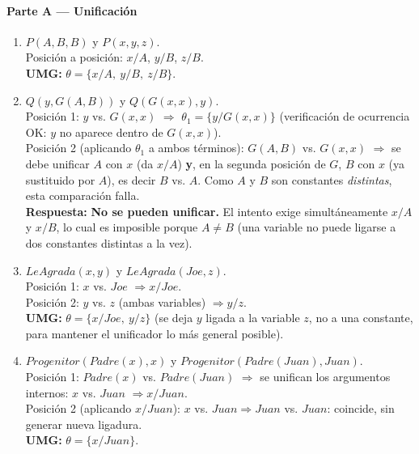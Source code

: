 \paragraph{Parte A --- Unificación}

\begin{enumerate}
    \item $P(A,B,B)$ y $P(x,y,z)$.\\
    Posición a posición: $x/A$, $y/B$, $z/B$.\\
    \textbf{UMG:} $\theta = \{x/A,\ y/B,\ z/B\}$.

    \item $Q(y, G(A,B))$ y $Q(G(x,x), y)$.\\
    Posición 1: $y$ vs. $G(x,x)$ $\Rightarrow$ $\theta_1=\{y/G(x,x)\}$ (verificación de ocurrencia
    OK: $y$ no aparece dentro de $G(x,x)$).\\
    Posición 2 (aplicando $\theta_1$ a ambos términos): $G(A,B)$ vs. $G(x,x)$ $\Rightarrow$ se debe
    unificar $A$ con $x$ (da $x/A$) \textbf{y}, en la segunda posición de $G$, $B$ con $x$ (ya
    sustituido por $A$), es decir $B$ vs. $A$. Como $A$ y $B$ son constantes \emph{distintas}, esta
    comparación falla.\\
    \textbf{Respuesta:} \textbf{No se pueden unificar.} El intento exige simultáneamente $x/A$ y
    $x/B$, lo cual es imposible porque $A\neq B$ (una variable no puede ligarse a dos constantes
    distintas a la vez).

    \item $LeAgrada(x,y)$ y $LeAgrada(Joe,z)$.\\
    Posición 1: $x$ vs. $Joe$ $\Rightarrow x/Joe$.\\
    Posición 2: $y$ vs. $z$ (ambas variables) $\Rightarrow y/z$.\\
    \textbf{UMG:} $\theta = \{x/Joe,\ y/z\}$ (se deja $y$ ligada a la variable $z$, no a una
    constante, para mantener el unificador lo más general posible).

    \item $Progenitor(Padre(x),x)$ y $Progenitor(Padre(Juan),Juan)$.\\
    Posición 1: $Padre(x)$ vs. $Padre(Juan)$ $\Rightarrow$ se unifican los argumentos internos:
    $x$ vs. $Juan$ $\Rightarrow x/Juan$.\\
    Posición 2 (aplicando $x/Juan$): $x$ vs. $Juan \Rightarrow Juan$ vs. $Juan$: coincide, sin
    generar nueva ligadura.\\
    \textbf{UMG:} $\theta = \{x/Juan\}$.
\end{enumerate}

